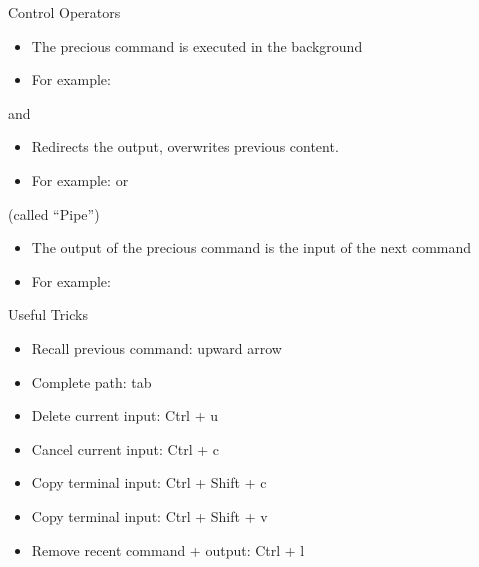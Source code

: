 \documentclass{setbeamer}
\begin{document}
\begin{frame}{Control Operators}
    \begin{itemize}
        \item The precious command is executed in the background
        \item For example: 
    \end{itemize}

    \vspace{0.3cm}

     and 
    \begin{itemize}
        \item Redirects the output,  overwrites previous content.
        \item For example:  or 
    \end{itemize}

    \vspace{0.3cm}

     (called ``Pipe'')
    \begin{itemize}
        \item The output of the precious command is the input of the next command
        \item For example: 
    \end{itemize}
\end{frame} 



\begin{frame}{Useful Tricks}
   
    \begin{itemize}
        \item Recall previous command: upward arrow
        \item Complete path: tab
        \item Delete current input: Ctrl + u
        \item Cancel current input: Ctrl + c
        \item Copy terminal input: Ctrl + Shift + c
        \item Copy terminal input: Ctrl + Shift + v
        \item Remove recent command + output: Ctrl + l
    \end{itemize}
    
\end{frame} 
\end{document}
